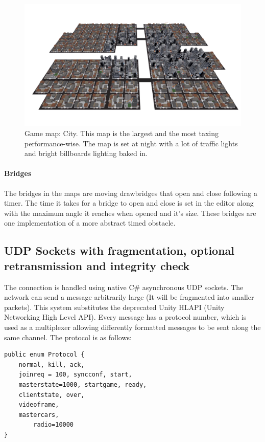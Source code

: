 \documentclass[12pt]{article}
\begin{document}
\begin{figure}[H]
\includegraphics[width=\textwidth]{map_city}
\caption{Game map: City. This map is the largest and the most taxing performance-wise. The map is set at night with a lot of traffic lights and bright billboards lighting baked in.}
\end{figure}

\paragraph{Bridges}
The bridges in the maps are moving drawbridges that open and close following a timer. The time it takes for a bridge to open and close is set in the editor along with the maximum angle it reaches when opened and it's size. These bridges are one implementation of a more abstract timed obstacle.

\clearpage

\subsection{UDP Sockets with fragmentation, optional retransmission and integrity check}
The connection is handled using native C\# asynchronous UDP sockets. The network can send a message arbitrarily large (It will be fragmented into smaller packets). This system substitutes the deprecated Unity HLAPI (Unity Networking High Level API). Every message has a protocol number, which is used as a multiplexer allowing differently formatted messages to be sent along the same channel. The protocol is as follows:


\lstset{style=sharpc}
\begin{lstlisting}
public enum Protocol {
	normal, kill, ack,
	joinreq = 100, syncconf, start, 
	masterstate=1000, startgame, ready, 
	clientstate, over, 
	videoframe, 
	mastercars,
        radio=10000
}
\end{lstlisting}
\end{document}
